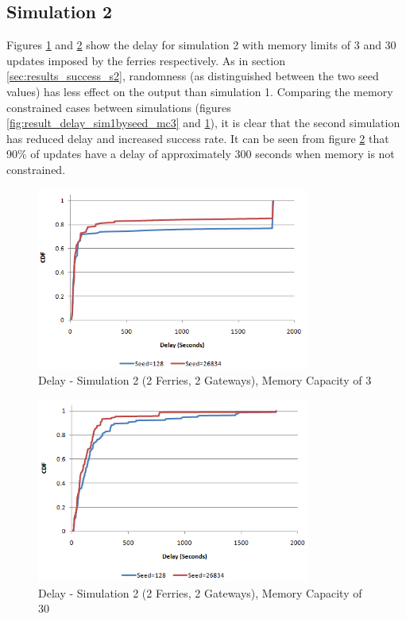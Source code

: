 \subsection{Simulation 2}

Figures \ref{fig:result_delay_sim2byseed_mc3} and \ref{fig:result_delay_sim2byseed_mc30} show the delay for simulation 2 with memory limits of 3 and 30 updates imposed by the ferries respectively.
As in section \ref{sec:results_success_s2}, randomness (as distinguished between the two seed values) has less effect on the output than simulation 1.
Comparing the memory constrained cases between simulations (figures \ref{fig:result_delay_sim1byseed_mc3} and \ref{fig:result_delay_sim2byseed_mc3}), it is clear that the second simulation has reduced delay and increased success rate.
It can be seen from figure \ref{fig:result_delay_sim2byseed_mc30} that 90\% of updates have a delay of approximately 300 seconds when memory is not constrained.

\begin{figure}[htbp]
    \centering
    \includegraphics[width=0.8\textwidth]{images/result_delay_sim2byseed_mc3}
    \caption{Delay - Simulation 2 (2 Ferries, 2 Gateways), Memory Capacity of 3}
    \label{fig:result_delay_sim2byseed_mc3}
\end{figure}


\begin{figure}[htbp]
    \centering
    \includegraphics[width=0.8\textwidth]{images/result_delay_sim2byseed_mc30}
    \caption{Delay - Simulation 2 (2 Ferries, 2 Gateways), Memory Capacity of 30}
    \label{fig:result_delay_sim2byseed_mc30}
\end{figure}

